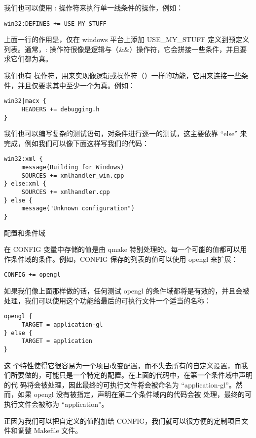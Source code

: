 我们也可以使用 : 操作符来执行单一线条件的操作，例如：

\begin{verbatim}
win32:DEFINES += USE_MY_STUFF
\end{verbatim}

上面一行的作用是，仅在 windows 平台上添加 USE\_MY\_STUFF
定义到预定义列表。通常，:
操作符很像是逻辑与（\&\&）操作符，它会拼接一些条件，并且要求它们都为真。

我们也有 \textbar{}
操作符，用来实现像逻辑或操作符（\textbar{}）一样的功能，它用来连接一些条件，并且仅要求其中至少一个为真。例如：

\begin{verbatim}
win32|macx {
     HEADERS += debugging.h
}
\end{verbatim}

我们也可以编写复杂的测试语句，对条件进行逐一的测试，这主要依靠 ``else''
来完成，例如我们可以像下面这样写我们的代码：

\begin{verbatim}
win32:xml {
     message(Building for Windows)
     SOURCES += xmlhandler_win.cpp
} else:xml {
     SOURCES += xmlhandler.cpp
} else {
     message("Unknown configuration")
}
\end{verbatim}

配置和条件域

在 CONFIG 变量中存储的值是由 qmake
特别处理的。每一个可能的值都可以用作条件域的条件。例如，CONFIG
保存的列表的值可以使用 opengl 来扩展：

\begin{verbatim}
CONFIG += opengl
\end{verbatim}

如果我们像上面那样做的话，任何测试 opengl
的条件域都将是有效的，并且会被处理，我们可以使用这个功能给最后的可执行文件一个适当的名称：

\begin{verbatim}
opengl {
     TARGET = application-gl
} else {
     TARGET = application
}
\end{verbatim}

这
个特性使得它很容易为一个项目改变配置，而不失去所有的自定义设置，而我们所要做的，可能只是一个特定的配置。在上面的代码中，在第一个条件域中声明的代
码将会被处理，因此最终的可执行文件将会被命名为
``application-gl''。然而，如果 opengl
没有被指定，声明在第二个条件域内的代码会被
处理，最终的可执行文件会被称为 ``application''。

正因为我们可以把自定义的值附加给
CONFIG，我们就可以很方便的定制项目文件和调整 Makefile 文件。

